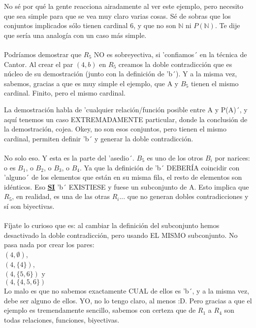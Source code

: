 	\noindent
	No sé por qué la gente reacciona airadamente al ver este ejemplo, pero necesito que sea simple para que se vea muy claro varias cosas. Sé de sobras que los conjuntos implicados sólo tienen cardinal 6, y que no son $\mathbb{N}$ ni $P(\mathbb{N})$. Te dije que sería una analogía con un caso más simple.\\\\
	
	\noindent
	Podríamos demostrar que $R_{5}$ NO es sobreyectiva, si 'confiamos´ en la técnica de Cantor. Al crear el par $(4, b)$ en $R_{5}$ creamos la doble contradicción que es núcleo de su demostración (junto con la definición de 'b´). Y a la misma vez, sabemos, gracias a que es muy simple el ejemplo, que A y $B_{5}$ tienen el mismo cardinal. Finito, pero el mismo cardinal.
	
	\noindent
	La demostración habla de 'cualquier relación/función posible entre A y P(A)´, y aquí tenemos un caso EXTREMADAMENTE particular, donde la conclusión de la demostración, cojea. Okey, no son esos conjuntos, pero tienen el mismo cardinal, permiten definir 'b´ y generar la doble contradicción. \\\\
	
	\noindent
	No solo eso. Y esta es la parte del 'asedio´. $B_{5}$ es uno de los otros $B_{i}$ por narices: o es $B_{1}$, o $B_{2}$, o $B_{3}$, o $B_{4}$. Ya que la definición de 'b´ DEBERÍA coincidir con 'alguno´ de los elementos que están en su misma fila, el resto de elementos son idénticos. Eso \textbf{\underline{SI}} 'b´ EXISTIESE y fuese un subconjunto de A. Esto implica que $R_{5}$, en realidad, es una de las otras $R_{i}$... que no generan dobles contradicciones y sí son biyectivas.\\\\
	
	\noindent
	Fíjate lo curioso que es: al cambiar la definición del subconjunto hemos desactivado la doble contradicción, pero usando EL MISMO subconjunto. No pasa nada por crear los pares:\\
	$(4, \emptyset)$, \\ 
	$(4, \{4\})$,     \\
	$(4, \{5,6\})$ y  \\
	$(4, \{4,5,6\})$  \\
	Lo malo es que no sabemos exactamente CUAL de ellos es 'b´, y a la misma vez, debe ser alguno de ellos. YO, no lo tengo claro, al menos :D. Pero gracias a que el ejemplo es tremendamente sencillo, sabemos con certeza que de $R_{1}$ a $R_{4}$ son todas relaciones, funciones, biyectivas.\\\\
	
